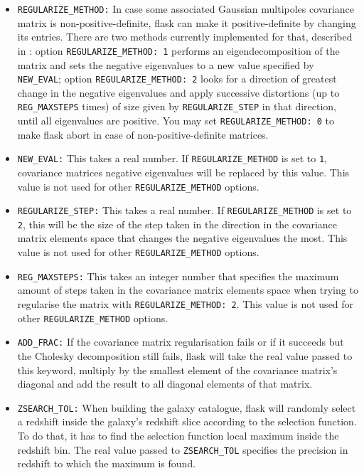 \documentclass[12pt]{book} %
\begin{document}
\begin{itemize}
\item {\tt REGULARIZE\_METHOD:} In case some associated Gaussian multipoles covariance matrix 
  is non-positive-definite, {\sc flask} can make it positive-definite by changing its entries. 
  There are two methods currently implemented for that, described in \citet{Xavier16mn}: option 
  {\tt REGULARIZE\_METHOD: 1} performs an eigendecomposition of the matrix and sets the negative eigenvalues to a 
  new value specified by {\tt NEW\_EVAL}; option {\tt REGULARIZE\_METHOD: 2} looks for a direction of greatest 
  change in the negative eigenvalues and apply successive distortions (up to {\tt REG\_MAXSTEPS} 
  times) of size given by {\tt REGULARIZE\_STEP} in that direction, until all eigenvalues are positive. You may set 
  {\tt REGULARIZE\_METHOD: 0} to make {\sc flask} abort in case of non-positive-definite matrices. 

\item {\tt NEW\_EVAL:} This takes a real number. If {\tt REGULARIZE\_METHOD} is set to {\tt 1}, 
  covariance matrices negative eigenvalues will be replaced by this value. This value is not used 
  for other {\tt REGULARIZE\_METHOD} options.

\item {\tt REGULARIZE\_STEP:} This takes a real number. If {\tt REGULARIZE\_METHOD} is set to {\tt 2},
  this will be the size of the step taken in the direction in the covariance matrix elements space that 
  changes the negative eigenvalues the most.  This value is not used for other {\tt REGULARIZE\_METHOD} 
  options.
  
\item {\tt REG\_MAXSTEPS:} This takes an integer number that specifies the maximum amount of 
  steps taken in the covariance matrix elements space when trying to regularise the matrix 
  with {\tt REGULARIZE\_METHOD: 2}. This value is not used for other {\tt REGULARIZE\_METHOD} 
  options. 

\item {\tt ADD\_FRAC:} If the covariance matrix regularisation fails or if it succeeds but the 
  Cholesky decomposition still fails, {\sc flask} will take the real value passed to this keyword, 
  multiply by the smallest element of the covariance matrix's diagonal and add the result to all 
  diagonal elements of that matrix. 

\item {\tt ZSEARCH\_TOL:} When building the galaxy catalogue, {\sc flask} will randomly select 
  a redshift inside the galaxy's redshift slice according to the selection function. To do that, 
  it has to find the selection function local maximum inside the redshift bin. The real value 
  passed to {\tt ZSEARCH\_TOL} specifies the precision in redshift to which the maximum is found.


\end{itemize}
\end{document}
